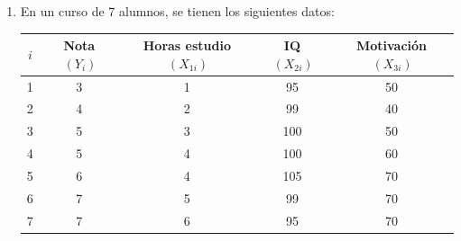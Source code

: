 \documentclass[10pt,a4paper]{article}
\begin{document}
\begin{enumerate}
\begin{enumerate}
Así, la recta ajustada es
\[
\widehat{Y}_i \;=\; \hat\beta_0+\hat\beta_1X_i=4.5+1.5X_i.
\]

\item \textbf{Cálculo de } $SST$, $SSE$ \textbf{y} $SSR$

\[
\begin{array}{|c|c|c|c|c|}
\hline
i & X_i & Y_i & \widehat Y_i = 4.5+1.5X_i & u_i = Y_i-\widehat Y_i \\
\hline
1 & 1 & 5  & 6  & -1 \\
2 & 3 & 10 & 9  & \; 1 \\
3 & 5 & 11 & 12 & -1 \\
4 & 7 & 18 & 15 & \; 3 \\
5 & 9 & 16 & 18 & -2 \\
\hline
\end{array}
\]

\[
\begin{aligned}
SSR &= \sum_{i=1}^{5} u_i^{\,2}
     = (-1)^2 + 1^2 + (-1)^2 + 3^2 + (-2)^2
     = 16,\\[6pt]
SST &= \sum_{i=1}^{5} (Y_i-\bar Y)^2
     = (5-12)^2 + (10-12)^2 + (11-12)^2 + (18-12)^2 + (16-12)^2
     = 106,\\[6pt]
SSE &= SST - SSR = 106 - 16 = 90.
\end{aligned}
\]

\item \textbf{Coeficiente de determinación}

\[
R^{2}
= \frac{SSE}{SST}
= 1-\frac{SSR}{SST}
= 1-\frac{16}{106}
\approx 0.849.
\]

Por lo tanto,
\[
\boxed{\hat\beta_0 = 4.5,\;\; \hat\beta_1 = 1.5,\;\;
SST = 106,\;\; SSR = 90,\;\; SSE = 16,\;\; R^{2}\approx 0.85.}
\]
\end{enumerate}

    \item En un curso de 7 alumnos, se tienen los siguientes datos:
    \begin{center}
\begin{tabular}{|c|c|c|c|c|}
\hline
$i$ & Nota $\, (Y_i)$ & Horas estudio $\, (X_{1i})$ & IQ $\, (X_{2i})$ & Motivación $\, (X_{3i})$\\
\hline
1 & 3 & 1 & 95 & 50\\
2 & 4 & 2 & 99 & 40\\
3 & 5 & 3 &100 & 50\\
4 & 5 & 4 &100 & 60\\
5 & 6 & 4 &105 & 70\\
6 & 7 & 5 & 99 & 70\\
7 & 7 & 6 & 95 & 70\\
\hline
\end{tabular}
\end{center}


\end{enumerate}
\end{document}
